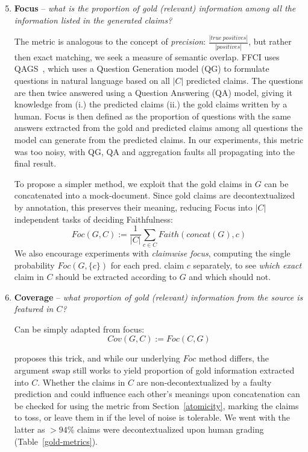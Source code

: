 \begin{enumerate}
    \setcounter{enumi}{4}
    \item \textbf{Focus} -- \textit{what is the proportion of gold (relevant) information among all the information listed in the generated claims?}
    
    The metric is analogous to the concept of \textit{precision}: $\frac{|true~positives|}{|positives|}$, but rather then exact matching, we seek a measure of semantic overlap.
    FFCI uses QAGS~\cite{wang-etal-2020-asking}, which uses a Question Generation model (QG) to formulate questions in natural language based on all $|C|$ predicted claims. The questions are then twice answered using a Question Answering (QA) model, giving it knowledge from (i.) the predicted claims (ii.) the gold claims written by a human.
    Focus is then defined as the proportion of questions with the same answers extracted from the gold and predicted claims among all questions the model can generate from the predicted claims.
    In our experiments, this metric was too noisy, with QG, QA and aggregation faults all propagating into the final result.

    To propose a simpler method, we exploit that the gold claims in $G$ can be concatenated into a mock-document.
    Since gold claims are decontextualized by annotation, this preserves their meaning, reducing Focus into $|C|$ independent tasks of deciding Faithfulness:
    $$Foc(G,C):=\frac{1}{|C|}\sum_{c\in C}Faith(concat(G), c)$$
    We also encourage experiments with \textit{claimwise focus}, computing the single probability $Foc(G,\{c\})$ for each pred. claim $c$ separately, to see \textit{which exact} claim in $C$ should be extracted according to $G$ and which should not.
    \item \textbf{Coverage} -- \textit{what proportion of gold (relevant) information from the source is featured in $C$?}
    
    Can be simply adapted from focus: 
    $$Cov(G,C) := Foc(C,G)$$

    \citealt{ffci} proposes this trick, and while our underlying $Foc$ method differs, the argument swap still works to yield proportion of gold information extracted into $C$. 
    Whether the claims in $C$ are non-decontextualized by a faulty prediction and could influence each other's meanings upon concatenation can be checked for using the metric from Section~\ref{atomicity}, marking the claims to toss, or leave them in if the level of noise is tolerable.
    We went with the latter as $>94\%$ claims were decontextualized upon human grading (Table~\ref{gold-metrics}).
    

\end{enumerate}
